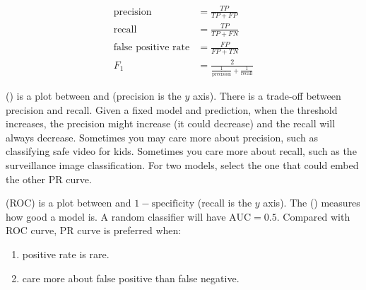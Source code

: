 \begin{equation}
    \begin{aligned}
	\text{precision} &= \frac{TP}{TP + FP} \\
	\text{recall} &= \frac{TP}{TP + FN} \\
	\text{false positive rate} &= \frac{FP}{FP + TN} \\
    F_1 &= \frac{2}{\displaystyle \frac{1}{\text{precision}} + \frac{1}{\text{recall}}}
    \end{aligned}    
\end{equation}




 () is a plot between  and  (precision is the $y$ axis). There is a trade-off between precision and recall. Given a fixed model and prediction, when the threshold increases, the precision might increase (it could decrease) and the recall will always decrease. Sometimes you may care more about precision, such as classifying safe video for kids. Sometimes you care more about recall, such as the surveillance image classification. For two models, select the one that could embed the other PR curve.




 (ROC) is a plot between  and $1 - \text{specificity}$ (recall is the $y$ axis). The  () measures how good a model is. A random classifier will have $\text{AUC} = 0.5$. Compared with ROC curve, PR curve is preferred when:
\begin{enumerate}
	\item positive rate is rare.
	\item care more about false positive than false negative.
\end{enumerate}
















